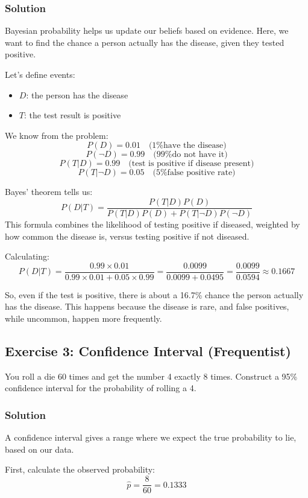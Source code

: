 \documentclass{book}
\begin{document}
\subsubsection*{Solution}
Bayesian probability helps us update our beliefs based on evidence. Here, we want to find the chance a person actually has the disease, given they tested positive.

Let's define events:
\begin{itemize}
    \item $D$: the person has the disease
    \item $T$: the test result is positive
\end{itemize}

We know from the problem:
\[
P(D) = 0.01 \quad\text{(1\% have the disease)}
\]
\[
P(\neg D) = 0.99 \quad\text{(99\% do not have it)}
\]
\[
P(T | D) = 0.99 \quad\text{(test is positive if disease present)}
\]
\[
P(T | \neg D) = 0.05 \quad\text{(5\% false positive rate)}
\]

Bayes’ theorem tells us:
\[
P(D | T) = \frac{P(T|D)P(D)}{P(T|D)P(D) + P(T|\neg D)P(\neg D)}
\]
This formula combines the likelihood of testing positive if diseased, weighted by how common the disease is, versus testing positive if not diseased.

Calculating:
\[
P(D | T) = \frac{0.99 \times 0.01}{0.99 \times 0.01 + 0.05 \times 0.99} = \frac{0.0099}{0.0099 + 0.0495} = \frac{0.0099}{0.0594} \approx 0.1667
\]

So, even if the test is positive, there is about a 16.7\% chance the person actually has the disease. This happens because the disease is rare, and false positives, while uncommon, happen more frequently.

\subsection*{Exercise 3: Confidence Interval (Frequentist)}
You roll a die 60 times and get the number 4 exactly 8 times. Construct a 95\% confidence interval for the probability of rolling a 4.

\subsubsection*{Solution}
A confidence interval gives a range where we expect the true probability to lie, based on our data.

First, calculate the observed probability:
\[
\hat{p} = \frac{8}{60} = 0.1333
\]
\end{document}
